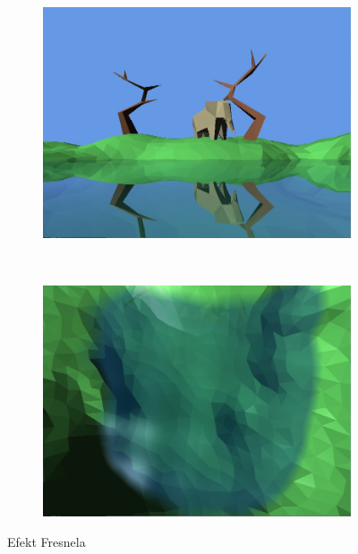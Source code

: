 \documentclass[a4paper,twoside,12pt]{book}
\begin{document}
\begin{itemize}
    \begin{figure}[H]
        \centering
        \begin{subfigure}[b]{0.475\textwidth}
            \includegraphics[width=\textwidth]{res/water_fresnel1.png}
            \label{fig:water_fresnel1}
        \end{subfigure}
        ~ %
        \begin{subfigure}[b]{0.475\textwidth}
            \includegraphics[width=\textwidth]{res/water_fresnel2.png}
            \label{fig:water_fresnel2}
        \end{subfigure}
        \caption{Efekt Fresnela}
        \label{fig:water_fresnel}
    \end{figure}


\end{itemize}
\end{document}
